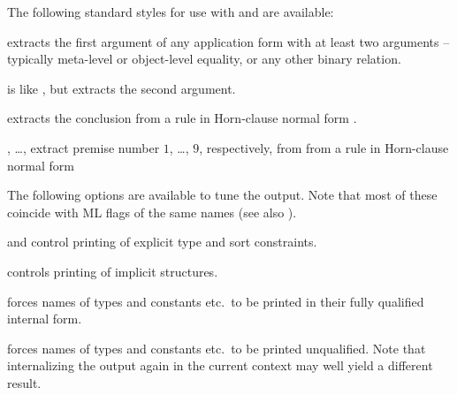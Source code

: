 \begin{isabellebody}
\begin{isamarkuptext}
\begin{descr}
  \end{descr}

  \medskip The following standard styles for use with  and  are available:

  \begin{descr}
  
  \item [\isa{lhs}] extracts the first argument of any application
  form with at least two arguments -- typically meta-level or
  object-level equality, or any other binary relation.
  
  \item [\isa{rhs}] is like , but extracts the second
  argument.
  
  \item [\isa{concl}] extracts the conclusion  from a rule
  in Horn-clause normal form .
  
  \item [\isa{prem{\isadigit{1}}}, \dots, \isa{prem{\isadigit{9}}}] extract premise
  number $1$, \dots, $9$, respectively, from from a rule in
  Horn-clause normal form 

  \end{descr}

  \medskip
  The following options are available to tune the output.  Note that most of
  these coincide with ML flags of the same names (see also \cite{isabelle-ref}).

  \begin{descr}

  \item[\isa{show{\isacharunderscore}types\ {\isacharequal}\ bool} and \isa{show{\isacharunderscore}sorts\ {\isacharequal}\ bool}]
  control printing of explicit type and sort constraints.

  \item[\isa{show{\isacharunderscore}structs\ {\isacharequal}\ bool}] controls printing of implicit
  structures.

  \item[\isa{long{\isacharunderscore}names\ {\isacharequal}\ bool}] forces names of types and
  constants etc.\ to be printed in their fully qualified internal
  form.

  \item[\isa{short{\isacharunderscore}names\ {\isacharequal}\ bool}] forces names of types and
  constants etc.\ to be printed unqualified.  Note that internalizing
  the output again in the current context may well yield a different
  result.


\end{descr}
\end{isamarkuptext}
\end{isabellebody}
